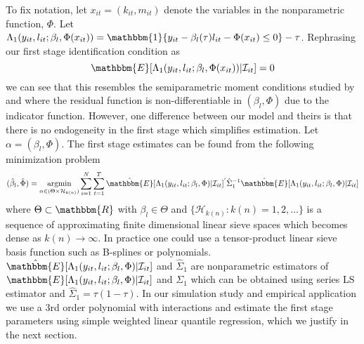\documentclass[11pt]{article}
\begin{document}
To fix notation, let $x_{it}=(k_{it}, m_{it})$ denote the variables in the nonparametric function, $\Phi$. Let $\Lambda_{1}(y_{it}, l_{it}; \beta_{l}, \Phi(x_{it}))=\mathbbm{1}\{y_{it}-\beta_{l}(\tau)l_{it}-\Phi(x_{it})\leq 0\}-\tau$. Rephrasing our first stage identification condition as 
\begin{equation} \label{residual}
\mathbbm{E}[\Lambda_{1}(y_{it}, l_{it}; \beta_{l}, \Phi(x_{it}))|\mathcal{I}_{it}]=0
\end{equation}
we can see that this resembles the semiparametric moment conditions studied by \cite{Chen2009} and \cite{Ai2012} where the residual function is non-differentiable in $(\beta_{l}, \Phi)$ due to the indicator function. However, one difference between our model and theirs is that there is no endogeneity in the first stage which simplifies estimation. Let $\alpha=(\beta_{l}, \Phi)$. The first stage estimates can be found from the following minimization problem
\begin{equation}
(\hat{\beta}_{l}, \hat{\Phi})=\underset{\alpha\in(\Theta\times \mathcal{H}_{k(n)})}{\operatorname{argmin}}\sum_{i=1}^{N}\sum_{t=1}^{T}\hat{\mathbbm{E}}[\Lambda_{1}(y_{it}, l_{it}; \beta_{l}, \Phi)|\mathcal{I}_{it}]^{'}\hat{\Sigma}_{1}^{-1}\hat{\mathbbm{E}}[\Lambda_{1}(y_{it}, l_{it}; \beta_{l}, \Phi)|\mathcal{I}_{it}]
\end{equation}
where $\Theta\subset \mathbbm{R}$ with $\beta_{l}\in\Theta$ and $\{\mathcal{H}_{k(n)}: k(n)=1,2,\dots\}$ is a sequence of approximating finite dimensional linear sieve spaces which becomes dense as $k(n)\rightarrow \infty$. In practice one could use a tensor-product linear sieve basis function such as B-splines or polynomials. $\hat{\mathbbm{E}}[\Lambda_{1}(y_{it}, l_{it}; \beta_{l}, \Phi)|\mathcal{I}_{it}]$ and $\hat{\Sigma}_{1}$ are nonparametric estimators of $\mathbbm{E}[\Lambda_{1}(y_{it}, l_{it}; \beta_{l}, \Phi)|\mathcal{I}_{it}]$ and $\Sigma_{1}$ which can be obtained using series LS estimator and $\hat{\Sigma}_{1}=\tau(1-\tau)$. In our simulation study and empirical application we use a 3rd order polynomial with interactions and estimate the first stage parameters using simple weighted linear quantile regression, which we justify in the next section.
\end{document}
